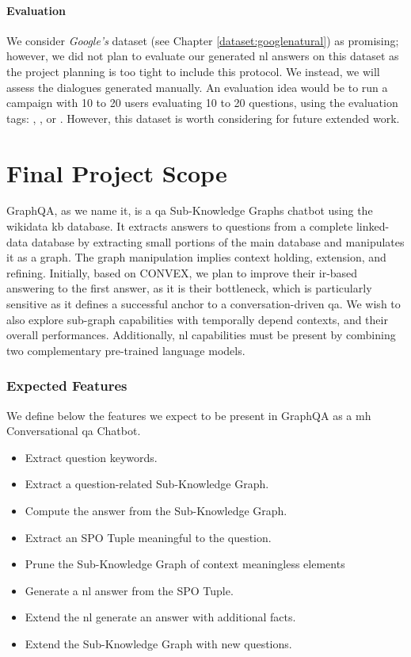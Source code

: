 \paragraph{Evaluation}
We consider \textit{Google's} dataset (see Chapter \ref{dataset:googlenatural}) as promising; however, we did not plan to evaluate our generated \gls{nl} answers on this dataset as the project planning is too tight to include this protocol. We instead, we will assess the dialogues generated manually. An evaluation idea would be to run a campaign with 10 to 20 users evaluating 10 to 20 questions, using the evaluation tags: , , or . However, this dataset is worth considering for future extended work. 

\section{Final Project Scope}
GraphQA, as we name it, is a \gls{qa} Sub-Knowledge Graphs chatbot using  the \gls{wikidata} \gls{kb} database. It extracts answers to questions from a complete \gls{linked-data} database by extracting small portions of the main database and manipulates it as a graph. The graph manipulation implies context holding, extension, and refining. Initially, based on CONVEX, we plan to improve their \gls{ir}-based answering to the first answer, as it is their bottleneck, which is particularly sensitive as it defines a successful anchor to a conversation-driven \gls{qa}. We wish to also explore sub-graph capabilities with temporally depend contexts, and their overall performances. Additionally, \gls{nl} capabilities must be present by combining two complementary pre-trained language models.

\subsubsection{Expected Features}
We define below the features we expect to be present in GraphQA as a \gls{mh} Conversational \gls{qa} Chatbot.

\begin{itemize}
    \setlength\itemsep{0em}
    \item Extract question keywords.
    \item Extract a question-related Sub-Knowledge Graph.
    \item Compute the answer from the Sub-Knowledge Graph.
    \item Extract an SPO Tuple meaningful to the question.
    \item Prune the Sub-Knowledge Graph of context meaningless elements
    \item Generate a \gls{nl} answer from the SPO Tuple.
    \item Extend the \gls{nl} generate an answer with additional facts.
    \item Extend the Sub-Knowledge Graph with new questions.
\end{itemize}


